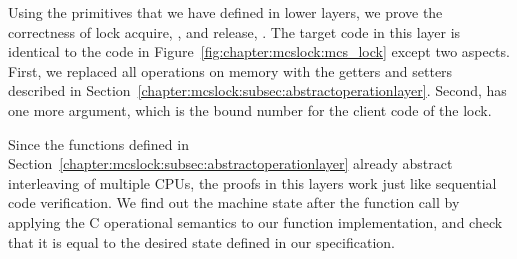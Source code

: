 Using the primitives that we have defined in lower layers, we prove the correctness of lock acquire, , and release, .
The target code in this layer is identical to the code in Figure~\ref{fig:chapter:mcslock:mcs_lock} except two aspects. 
First, we replaced all operations on memory with the getters and setters described in Section~\ref{chapter:mcslock:subsec:abstractoperationlayer}.
Second,  has one more
 argument, which is the bound number for the client code of the lock.

Since the functions defined in
Section~\ref{chapter:mcslock:subsec:abstractoperationlayer} already abstract interleaving
of multiple CPUs, the proofs in this layers work just like sequential
code verification. We find out the machine state after the function
call by applying the C operational semantics to our function
implementation, and check that it is equal to the desired state
defined in our specification.


